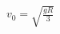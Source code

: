 \documentclass[preview]{standalone}
\begin{document}
\begin{align*}
v_0 = \sqrt{\frac{gR}{3}}
\end{align*}
\end{document}

